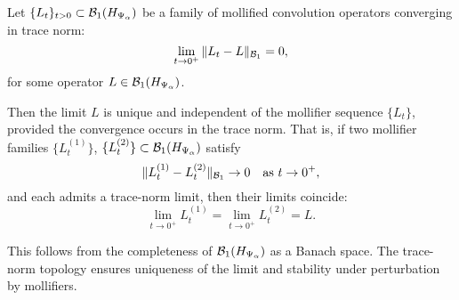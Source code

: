 \begin{lemma}
\label{lem:trace_norm_limit_unique}
Let \( \{L_t\}_{t > 0} \subset \mathcal{B}_1(H_{\Psi_\alpha}) \) be a family of mollified convolution operators converging in trace norm:
\[
\lim_{t \to 0^+} \| L_t - L \|_{\mathcal{B}_1} = 0,
\]
for some operator \( L \in \mathcal{B}_1(H_{\Psi_\alpha}) \).

Then the limit \( L \) is unique and independent of the mollifier sequence \( \{L_t\} \), provided the convergence occurs in the trace norm. That is, if two mollifier families \( \{L_t^{(1)}\} \), \( \{L_t^{(2)}\} \subset \mathcal{B}_1(H_{\Psi_\alpha}) \) satisfy
\[
\|L_t^{(1)} - L_t^{(2)}\|_{\mathcal{B}_1} \to 0 \quad \text{as } t \to 0^+,
\]
and each admits a trace-norm limit, then their limits coincide:
\[
\lim_{t \to 0^+} L_t^{(1)} = \lim_{t \to 0^+} L_t^{(2)} = L.
\]

\medskip
\noindent
This follows from the completeness of \( \mathcal{B}_1(H_{\Psi_\alpha}) \) as a Banach space. The trace-norm topology ensures uniqueness of the limit and stability under perturbation by mollifiers.
\end{lemma}
